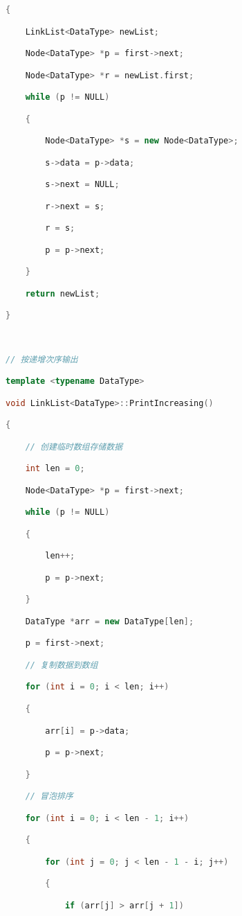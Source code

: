 \begin{lstlisting}[language=C++]
{

    LinkList<DataType> newList;

    Node<DataType> *p = first->next;

    Node<DataType> *r = newList.first;

    while (p != NULL)

    {

        Node<DataType> *s = new Node<DataType>;

        s->data = p->data;

        s->next = NULL;

        r->next = s;

        r = s;

        p = p->next;

    }

    return newList;

}

  

// 按递增次序输出

template <typename DataType>

void LinkList<DataType>::PrintIncreasing()

{

    // 创建临时数组存储数据

    int len = 0;

    Node<DataType> *p = first->next;

    while (p != NULL)

    {

        len++;

        p = p->next;

    }

    DataType *arr = new DataType[len];

    p = first->next;

    // 复制数据到数组

    for (int i = 0; i < len; i++)

    {

        arr[i] = p->data;

        p = p->next;

    }

    // 冒泡排序

    for (int i = 0; i < len - 1; i++)

    {

        for (int j = 0; j < len - 1 - i; j++)

        {

            if (arr[j] > arr[j + 1])


\end{lstlisting}
